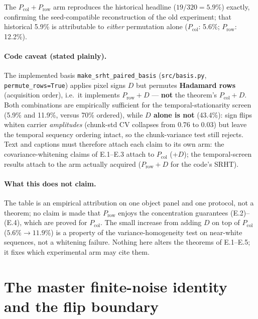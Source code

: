 The $P_{\mathrm{col}}+P_{\mathrm{row}}$ arm reproduces the historical headline ($19/320=5.9\%$) exactly, confirming the seed-compatible reconstruction of the old experiment; that historical 5.9\% is attributable to \emph{either} permutation alone ($P_{\mathrm{col}}$: 5.6\%; $P_{\mathrm{row}}$: 12.2\%).

\paragraph{Code caveat (stated plainly).} The implemented basis \texttt{make\_srht\_paired\_basis} (\texttt{src/basis.py}, \texttt{permute\_rows=True}) applies pixel signs $D$ but permutes \textbf{Hadamard rows} (acquisition order), i.e.\ it implements $P_{\mathrm{row}}+D$ --- \textbf{not} the theorem's $P_{\mathrm{col}}+D$. Both combinations are empirically sufficient for the temporal-stationarity screen (5.9\% and 11.9\%, versus 70\% ordered), while \textbf{$D$ alone is not} (43.4\%): sign flips whiten carrier \emph{amplitudes} (chunk-std CV collapses from 0.76 to 0.03) but leave the temporal sequency ordering intact, so the chunk-variance test still rejects. Text and captions must therefore attach each claim to its own arm: the covariance-whitening claims of E.1--E.3 attach to $P_{\mathrm{col}}$ (+$D$); the temporal-screen results attach to the arm actually acquired ($P_{\mathrm{row}}+D$ for the code's SRHT).

\paragraph{What this does not claim.} The table is an empirical attribution on one object panel and one protocol, not a theorem; no claim is made that $P_{\mathrm{row}}$ enjoys the concentration guarantees (E.2)--(E.4), which are proved for $P_{\mathrm{col}}$. The small increase from adding $D$ on top of $P_{\mathrm{col}}$ ($5.6\%\to11.9\%$) is a property of the variance-homogeneity test on near-white sequences, not a whitening failure. Nothing here alters the theorems of E.1--E.5; it fixes which experimental arm may cite them.

\section{The master finite-noise identity and the flip boundary}

